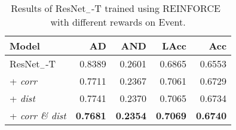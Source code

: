 \begin{table}[t]
\centering
\caption{Results of ResNet$_{-}$-T trained using REINFORCE~\cite{williams1992simple} with different rewards on Event.}
\label{tab:rl}
\begin{small}
\begin{tabular}{lrrrr}
\toprule
Model & AD & AND & LAcc & Acc \\
\midrule
ResNet$_{-}$-T & 0.8389 & 0.2601 & 0.6865 & 0.6553 \\
\hspace{0.2em} + \textit{corr} & 0.7711 & 0.2367 & 0.7061 & 0.6729 \\
\hspace{0.2em} + \textit{dist} & 0.7741 & 0.2370 & 0.7065 & 0.6734 \\
\hspace{0.2em} + \textit{corr \& dist} & \textbf{0.7681} & \textbf{0.2354} & \textbf{0.7069} & \textbf{0.6740} \\
\bottomrule
\end{tabular}
\end{small}
\end{table}
